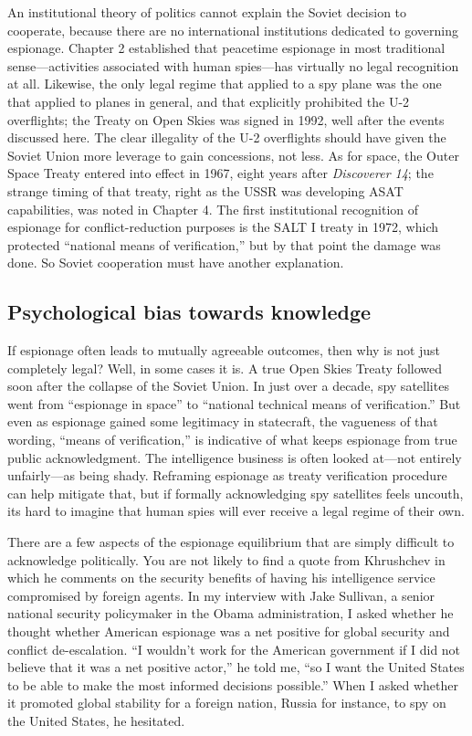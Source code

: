 \documentclass{memoir}
\begin{document}
\begin{refsegment}
An institutional theory of politics cannot explain the Soviet decision to cooperate, because there are no international institutions dedicated to governing espionage. Chapter 2 established that peacetime espionage in most traditional sense---activities associated with human spies---has virtually no legal recognition at all. Likewise, the only legal regime that applied to a spy plane was the one that applied to planes in general, and that explicitly prohibited the U-2 overflights; the Treaty on Open Skies was signed in 1992, well after the events discussed here. The clear illegality of the U-2 overflights should have given the Soviet Union more leverage to gain concessions, not less. As for space, the Outer Space Treaty entered into effect in 1967, eight years after \emph{Discoverer 14}; the strange timing of that treaty, right as the USSR was developing ASAT capabilities, was noted in Chapter 4. The first institutional recognition of espionage for conflict-reduction purposes is the SALT I treaty in 1972, which protected ``national means of verification,'' but by that point the damage was done. So Soviet cooperation must have another explanation.

\subsection{Psychological bias towards knowledge}
If espionage often leads to mutually agreeable outcomes, then why is not just completely legal? Well, in some cases it is. A true Open Skies Treaty followed soon after the collapse of the Soviet Union. In just over a decade, spy satellites went from ``espionage in space'' to ``national technical means of verification.'' But even as espionage gained some legitimacy in statecraft, the vagueness of that wording, ``means of verification,'' is indicative of what keeps espionage from true public acknowledgment. The intelligence business is often looked at---not entirely unfairly---as being shady. Reframing espionage as treaty verification procedure can help mitigate that, but if formally acknowledging spy satellites feels uncouth, its hard to imagine that human spies will ever receive a legal regime of their own.

There are a few aspects of the espionage equilibrium that are simply difficult to acknowledge politically. You are not likely to find a quote from Khrushchev in which he comments on the security benefits of having his intelligence service compromised by foreign agents. In my interview with Jake Sullivan, a senior national security policymaker in the Obama administration, I asked whether he thought whether American espionage was a net positive for global security and conflict de-escalation. ``I wouldn't work for the American government if I did not believe that it was a net positive actor,'' he told me, ``so I want the United States to be able to make the most informed decisions possible.'' When I asked whether it promoted global stability for a foreign nation, Russia for instance, to spy on the United States, he hesitated.


\end{refsegment}
\end{document}

